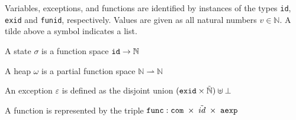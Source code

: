Variables, exceptions, and functions are identified by instances of the types \verb|id|, \verb|exid| and \verb|funid|, respectively. Values are given as all natural numbers $v\in\mathbb{N}$. A tilde above a symbol indicates a list.

A state $\sigma$ is a function space $\verb|id| \rightarrow \mathbb{N}$

A heap $\omega$ is a partial function space $\mathbb{N} \rightharpoonup \mathbb{N}$

An exception $\varepsilon$ is defined as the disjoint union $(\verb|exid|\times\tilde{\mathbb{N}})\uplus\bot$

A function is represented by the triple $\verb|func|: \verb|com| \; \times \; \tilde{id} \; \times \; \verb|aexp|$